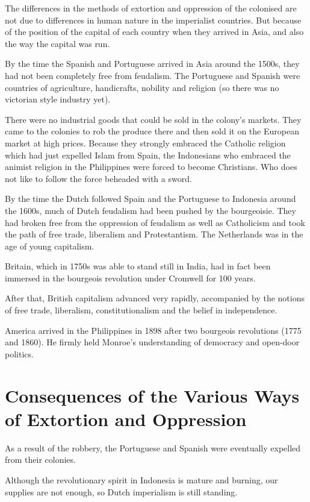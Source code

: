The differences in the methods of extortion and oppression of the colonised are 
not due to differences in human nature in the imperialist countries. 
But because of the position of the capital of each country when they 
arrived in Asia, and also the way the capital was run.\vskip 0.2in

By the time the Spanish and Portuguese arrived in Asia around the 
1500s, they had not been completely free from feudalism. The Portuguese 
and Spanish were countries of agriculture, handicrafts, nobility and 
religion (so there was no victorian style industry yet).\vskip 0.2in

There were no industrial goods that could be sold in the colony's 
markets. They came to the colonies to rob the produce there and then sold 
it on the European market at high prices. Because they strongly embraced 
the Catholic religion which had just expelled Islam from Spain, the Indonesians 
who embraced the animist religion in the Philippines were forced to become 
Christians. Who does not like to follow the force beheaded with a sword.\vskip 0.2in

By the time the Dutch followed Spain and the Portuguese to Indonesia around the 
1600s, much of Dutch feudalism had been pushed by the bourgeoisie. They had broken 
free from the oppression of feudalism as well as Catholicism and took the path of 
free trade, liberalism and Protestantism. The Netherlands was in the age of young capitalism.\vskip 0.2in

Britain, which in 1750s was able to stand still in India, had in fact been 
immersed in the bourgeois revolution under Cromwell for 100 years.\vskip 0.2in

After that, British capitalism advanced very rapidly, accompanied by the 
notions of free trade, liberalism, constitutionalism and the belief in independence.\vskip 0.2in

America arrived in the Philippines in 1898 after two bourgeois revolutions (1775 and 1860). 
He firmly held Monroe's understanding of democracy and open-door politics.\vskip 0.2in

\section{Consequences of the Various Ways of Extortion and Oppression}

As a result of the robbery, the Portuguese and Spanish were eventually expelled from their colonies.\vskip 0.2in

Although the revolutionary spirit in Indonesia is mature and burning, our supplies are not enough, so Dutch imperialism is still standing.\vskip 0.2in

